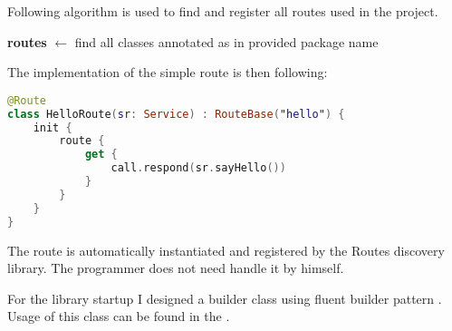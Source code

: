 \medskip \noindent
Following algorithm is used to find and register all routes used in the project.

\begin{algorithm}[H]
	\SetAlgoLined
	\textbf{routes} $\leftarrow$ find all classes annotated as  in provided package name\;
\end{algorithm} 
\medskip \noindent
The implementation of the simple route is then following:
\medskip
\begin{lstlisting}[language=Kotlin]
@Route
class HelloRoute(sr: Service) : RouteBase("hello") {
    init {
        route {
            get {
                call.respond(sr.sayHello())
            }
        }
    }
}
\end{lstlisting}

\medskip \noindent
The route is automatically instantiated and registered by the Routes discovery library.
The programmer does not need handle it by himself.

For the library startup I designed a builder class using fluent builder pattern .
Usage of this class can be found in the .